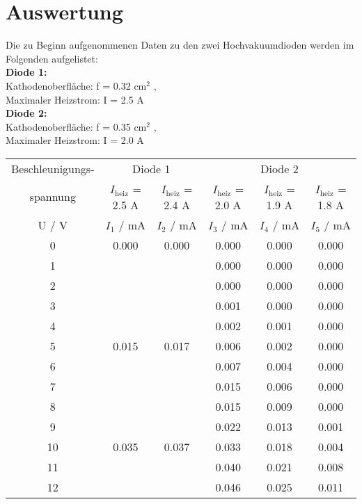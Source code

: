 \section{Auswertung}
\label{sec:Auswertung}
Die zu Beginn aufgenommenen Daten zu den zwei Hochvakuumdioden werden im Folgenden aufgelistet:\\
\textbf{Diode 1:} \\
  Kathodenoberfläche: f = 0.32 cm$^{2}$ , \\
  Maximaler Heizstrom: I = 2.5 A \\
\textbf{Diode 2:} \\
  Kathodenoberfläche: f = 0.35 cm$^{2}$ , \\
  Maximaler Heizstrom: I = 2.0 A \\

  \begin{table}[H] %
    \small
    \centering
    \begin{tabular}{c||c|c|c|c|c}
      \toprule
      Beschleunigungs- & \multicolumn{2}{c|}{Diode 1} & \multicolumn{3}{c}{Diode 2} \\
      spannung & $I_\text{heiz}$ = 2.5 A & $I_\text{heiz}$ = 2.4 A & $I_\text{heiz}$ = 2.0 A & $I_\text{heiz}$ = 1.9 A & $I_\text{heiz}$ = 1.8 A \\
      \midrule
      U / V & $I_1$ / mA & $I_2$ / mA & $I_3$ / mA & $I_4$ / mA & $I_5$ / mA \\
      \midrule
      0	  & 0.000 & 0.000 & 0.000	& 0.000	& 0.000 \\
      1	  &       &       & 0.000	& 0.000	& 0.000 \\
      2	  &       &       & 0.000	& 0.000	& 0.000 \\
      3	  &       &       & 0.001	& 0.000	& 0.000 \\
      4	  &       &       & 0.002	& 0.001	& 0.000 \\
      5	  & 0.015 & 0.017 & 0.006	& 0.002	& 0.000 \\
      6	  &       &       & 0.007	& 0.004	& 0.000 \\
      7	  &       &       & 0.015	& 0.006	& 0.000 \\
      8	  &       &       & 0.015	& 0.009	& 0.000 \\
      9	  &       &       & 0.022	& 0.013	& 0.001 \\
      10	& 0.035 & 0.037 & 0.033	& 0.018	& 0.004 \\
      11	&       &       & 0.040	& 0.021	& 0.008 \\
      12	&       &       & 0.046	& 0.025	& 0.011 \\

\end{tabular}
\end{table}
